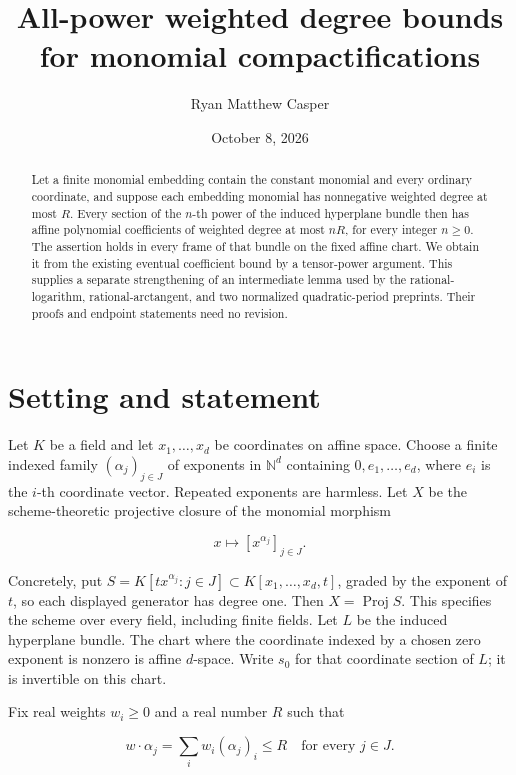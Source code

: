 \documentclass[11pt]{article}
\title{All-power weighted degree bounds\\for monomial compactifications}
\author{Ryan Matthew Casper}
\date{October 8, 2026}
\begin{document}
\maketitle

\begin{abstract}

Let a finite monomial embedding contain the constant monomial and every ordinary coordinate, and suppose each embedding monomial has nonnegative weighted degree at most \(R\). Every section of the \(n\)-th power of the induced hyperplane bundle then has affine polynomial coefficients of weighted degree at most \(nR\), for every integer \(n\geq0\). The assertion holds in every frame of that bundle on the fixed affine chart. We obtain it from the existing eventual coefficient bound by a tensor-power argument. This supplies a separate strengthening of an intermediate lemma used by the rational-logarithm, rational-arctangent, and two normalized quadratic-period preprints. Their proofs and endpoint statements need no revision.

\end{abstract}

\section{Setting and statement}

Let \(K\) be a field and let \(x_1,\ldots,x_d\) be coordinates on affine space. Choose a finite indexed family \((\alpha_j)_{j\in J}\) of exponents in \(\mathbb N^d\) containing \(0,e_1,\ldots,e_d\), where \(e_i\) is the \(i\)-th coordinate vector. Repeated exponents are harmless. Let \(X\) be the scheme-theoretic projective closure of the monomial morphism

\[
x\longmapsto [x^{\alpha_j}]_{j\in J}.
\]

Concretely, put \(S=K[t x^{\alpha_j}:j\in J]\subset K[x_1,\ldots,x_d,t]\), graded by the exponent of \(t\), so each displayed generator has degree one. Then \(X=\operatorname{Proj}S\). This specifies the scheme over every field, including finite fields. Let \(L\) be the induced hyperplane bundle. The chart where the coordinate indexed by a chosen zero exponent is nonzero is affine \(d\)-space. Write \(s_0\) for that coordinate section of \(L\); it is invertible on this chart.

Fix real weights \(w_i\geq0\) and a real number \(R\) such that

\[
w\cdot\alpha_j=\sum_i w_i(\alpha_j)_i\leq R
\quad\text{for every }j\in J.
\]
\end{document}
